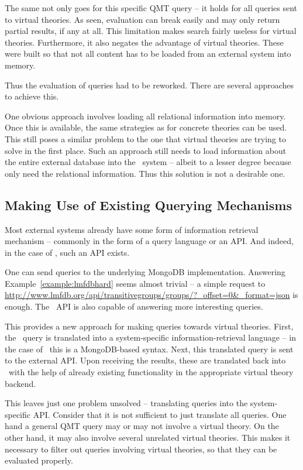 The same not only goes for this specific QMT query -- it holds for all queries sent to virtual theories. 
As seen, evaluation can break easily and may only return partial results, if any at all. 
This limitation makes search fairly useless for virtual theories. 
Furthermore, it also negates the advantage of virtual theories. 
These were built so that not all content has to be loaded from an external system into memory. 


Thus the evaluation of queries had to be reworked. 
There are several approaches to achieve this. 

One obvious approach involves loading all relational information into memory.
Once this is available, the same strategies as for concrete theories can be used. 
This still poses a similar problem to the one that virtual theories are trying to solve in the first place. 
Such an approach still needs to load information about the entire external database into the \mmt\ system -- albeit to a lesser degree because only need the relational information.
Thus this solution is not a desirable one. 

\subsection{Making Use of Existing Querying Mechanisms}\label{sec:comm:existing}

Most external systems already have some form of information retrieval mechanism -- commonly in the form of a query language or an API. 
And indeed, in the case of \lmfdb, such an API exists.

One can send queries to the underlying MongoDB implementation.
Answering Example~\ref{example:lmfdbhard} seems almost trivial -- a simple  request to \url{http://www.lmfdb.org/api/transitivegroups/groups/?_offset=0&_format=json} is enough.
The \lmfdb\ API is also capable of answering more interesting queries. 

This provides a new approach for making queries towards virtual theories. 
First, the \mmt\ query is translated into a system-specific information-retrieval language -- in the case of \lmfdb\ this is a MongoDB-based syntax.
Next, this translated query is sent to the external API. 
Upon receiving the results, these are translated back into \omdocmmt\ with the help of already existing functionality in the appropriate virtual theory backend.

This leaves just one problem unsolved -- translating queries into the system-specific API. 
Consider that it is not sufficient to just translate all queries. 
One hand a general QMT query may or may not involve a virtual theory. 
On the other hand, it may also involve several unrelated virtual theories. 
This makes it necessary to filter out queries involving virtual theories, so that they can be evaluated properly. 

